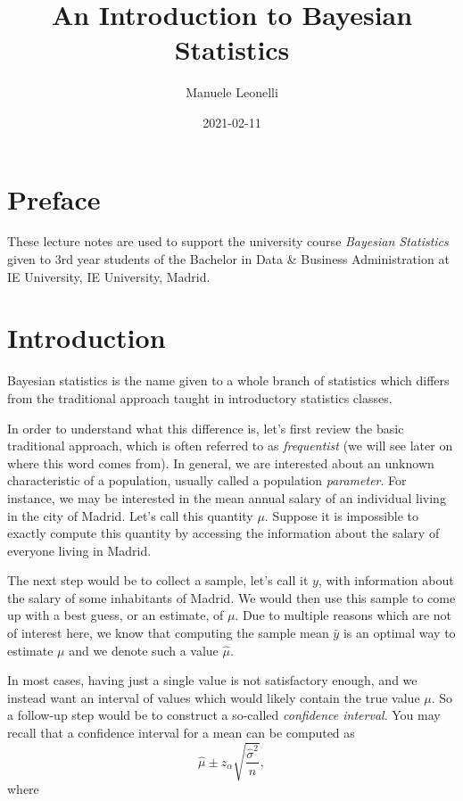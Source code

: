 \documentclass[
]{book}
\title{An Introduction to Bayesian Statistics}
\author{Manuele Leonelli}
\date{2021-02-11}
\begin{document}
\maketitle

{
\setcounter{tocdepth}{1}
\tableofcontents
}
\hypertarget{preface}{%
\chapter*{Preface}\label{preface}}

These lecture notes are used to support the university course \emph{Bayesian Statistics} given to 3rd year students of the Bachelor in Data \& Business Administration at IE University, IE University, Madrid.

\hypertarget{intro}{%
\chapter{Introduction}\label{intro}}

Bayesian statistics is the name given to a whole branch of statistics which differs from the traditional approach taught in introductory statistics classes.

In order to understand what this difference is, let's first review the basic traditional approach, which is often referred to as \emph{frequentist} (we will see later on where this word comes from). In general, we are interested about an unknown characteristic of a population, usually called a population \emph{parameter}. For instance, we may be interested in the mean annual salary of an individual living in the city of Madrid. Let's call this quantity \(\mu\). Suppose it is impossible to exactly compute this quantity by accessing the information about the salary of everyone living in Madrid.

The next step would be to collect a sample, let's call it \(y\), with information about the salary of some inhabitants of Madrid. We would then use this sample to come up with a best guess, or an estimate, of \(\mu\). Due to multiple reasons which are not of interest here, we know that computing the sample mean \(\bar{y}\) is an optimal way to estimate \(\mu\) and we denote such a value \(\hat{\mu}\).

In most cases, having just a single value is not satisfactory enough, and we instead want an interval of values which would likely contain the true value \(\mu\). So a follow-up step would be to construct a so-called \emph{confidence interval}. You may recall that a confidence interval for a mean can be computed as
\[
\hat{\mu}\pm z_{\alpha}\sqrt{\frac{\hat{\sigma}^2}{n}},
\]
where
\end{document}
